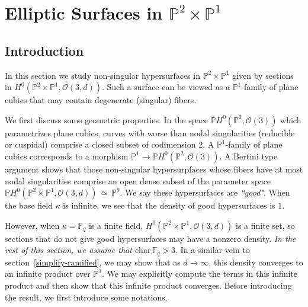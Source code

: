 \documentclass[12pt]{article}
\theoremstyle{plain}
\theoremstyle{definition}
\newcommand{\IF}{\mathbb{F}}
\newcommand{\IP}{\mathbb{P}}
\newcommand{\sO}{\mathcal{O}}
\newcommand\iso{{\, \simeq \,}}
\newcommand{\<}{\langle}
\renewcommand{\>}{\rangle}
\begin{document}
\section{Elliptic Surfaces in $\IP^2 \times \IP^1$}
\subsection{Introduction}
In this section we study non-singular hypersurfaces in $\IP^2 \times \IP^1$ given by sections in $H^0(\IP^2 \times \IP^1, \sO(3, d))$. Such a surface can be viewed as a $\IP^1$-family of plane cubics that may contain degenerate (singular) fibers.

We first discuss some geometric properties. In the space $\IP H^0(\IP^2, \sO(3))$ which parametrizes plane cubics, curves with worse than nodal singularities (reducible or cuspidal) comprise a closed subset of codimension $2$. A $\IP^1$-family of plane cubics corresponds to a morphism $\IP^1 \to \IP H^0(\IP^2, \sO(3))$. A Bertini type argument shows that those non-singular hypersurpfaces whose fibers have at most nodal singularities comprise an open dense subset of the parameter space $\IP H^0(\IP^2 \times \IP^1, \sO(3, d)) \iso \IP^9$. We say these hypersurfaces are \textit{``good"}. When the base field $\kappa$ is infinite, we see that the density of good hypersurfaces is $1$.

However, when $\kappa = \IF_q$ is a finite field, $H^0(\IP^2 \times \IP^1, \sO(3, d))$ is a finite set, so sections that do not give good hypersurfaces may have a nonzero density. \textit{In the rest of this section, we assume that $\mathrm{char\,}\IF_q > 3$}. In a similar vein to section~\ref{simplify-ramified}, we may show that as $d \to \infty$, this density converges to an infinite product over $\IP^1$. We may explicitly compute the terms in this infinite product and then show that this infinite product converges. Before introducing the result, we first introduce some notations. 
\end{document}
